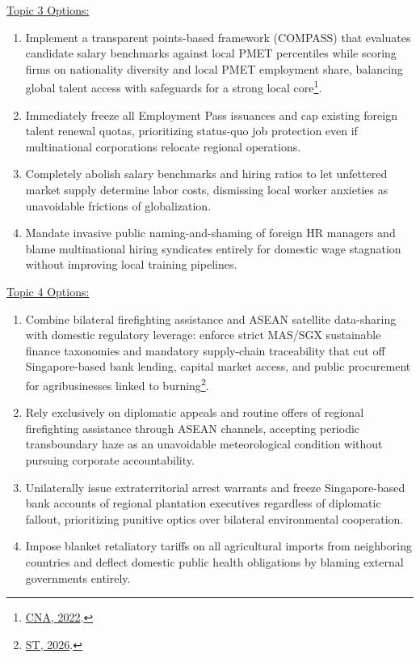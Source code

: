 \documentclass[titlepage]{article}
\begin{document}
\underline{Topic 3 Options:}
\begin{enumerate}
    \item Implement a transparent points-based framework (COMPASS) that evaluates candidate salary benchmarks against local PMET percentiles while scoring firms on nationality diversity and local PMET employment share, balancing global talent access with safeguards for a strong local core\footnote{\href{https://www.channelnewsasia.com/singapore/employment-pass-jobs-foreign-workers-mom-budget-2022-debate-parliament-2538966}{CNA, 2022}.}.
    \item Immediately freeze all Employment Pass issuances and cap existing foreign talent renewal quotas, prioritizing status-quo job protection even if multinational corporations relocate regional operations.
    \item Completely abolish salary benchmarks and hiring ratios to let unfettered market supply determine labor costs, dismissing local worker anxieties as unavoidable frictions of globalization.
    \item Mandate invasive public naming-and-shaming of foreign HR managers and blame multinational hiring syndicates entirely for domestic wage stagnation without improving local training pipelines.
\end{enumerate}

\underline{Topic 4 Options:}
\begin{enumerate}
    \item Combine bilateral firefighting assistance and ASEAN satellite data-sharing with domestic regulatory leverage: enforce strict MAS/SGX sustainable finance taxonomies and mandatory supply-chain traceability that cut off Singapore-based bank lending, capital market access, and public procurement for agribusinesses linked to burning\footnote{\href{https://www.straitstimes.com/singapore/why-cant-singapores-anti-haze-law-get-indonesian-companies-to-stop-the-fires}{ST, 2026}.}.
    \item Rely exclusively on diplomatic appeals and routine offers of regional firefighting assistance through ASEAN channels, accepting periodic transboundary haze as an unavoidable meteorological condition without pursuing corporate accountability.
    \item Unilaterally issue extraterritorial arrest warrants and freeze Singapore-based bank accounts of regional plantation executives regardless of diplomatic fallout, prioritizing punitive optics over bilateral environmental cooperation.
    \item Impose blanket retaliatory tariffs on all agricultural imports from neighboring countries and deflect domestic public health obligations by blaming external governments entirely.
\end{enumerate}
\end{document}
